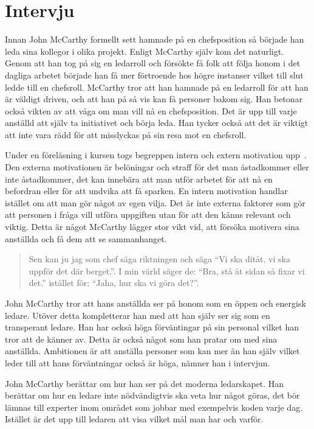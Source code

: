 \section{Intervju}
\label{sec:intervju}

Innan John McCarthy formellt sett hamnade på en chefsposition så började han leda sina kollegor i olika projekt. Enligt McCarthy själv kom det naturligt. Genom att han tog på sig en ledarroll och försökte få folk att följa honom i det dagliga arbetet började han få mer förtroende hos högre instanser vilket till slut ledde till en chefsroll. McCarthy tror att han hamnade på en ledarroll för att han är väldigt driven, och att han på så vis kan få personer bakom sig. Han betonar också vikten av att våga om man vill nå en chefsposition. Det är upp till varje anställd att själv ta initiativet och börja leda. Han tycker också att det är viktigt att inte vara rädd för att misslyckas på sin resa mot en chefsroll.

Under en föreläsning i kursen togs begreppen intern och extern motivation upp~\citep{motivation}. Den externa motivationen är belöningar och straff för det man åstadkommer eller inte åstadkommer, det kan innebära att man utför arbetet för att nå en befordran eller för att undvika att få sparken. En intern motivation handlar istället om att man gör något av egen vilja. Det är inte externa faktorer som gör att personen i fråga vill utföra uppgiften utan för att den känns relevant och viktig. Detta är något McCarthy lägger stor vikt vid, att försöka motivera sina anställda och få dem att se sammanhanget.

\begin{quote}
 Sen kan ju jag som chef säga riktningen och säga ``Vi ska ditåt, vi ska uppför det där berget.''. I min värld säger de: ``Bra, stå åt sidan så fixar vi det.'' istället för: ``Jaha, hur ska vi göra det?''.
\end{quote}

John McCarthy tror att hans anställda ser på honom som en öppen och energisk ledare. Utöver detta kompletterar han med att han själv ser sig som en transperant ledare. Han har också höga förväntingar på sin personal vilket han tror att de känner av. Detta är också något som han pratar om med sina anställda. Ambitionen är att anställa personer som kan mer än han själv vilket leder till att hans förväntningar också är höga, nämner han i intervjun.

John McCarthy berättar om hur han ser på det moderna ledarskapet. Han berättar om hur en ledare inte nödvändigtvis ska veta hur något göras, det bör lämnas till experter inom området som jobbar med exempelvis koden varje dag. Istället är det upp till ledaren att  visa vilket mål man har och varför.

